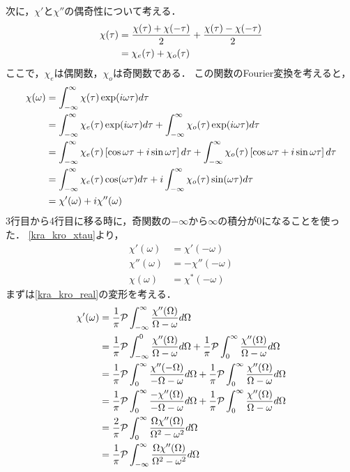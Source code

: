 次に，$\chi'$と$\chi''$の偶奇性について考える．
\begin{align}
  \chi(\tau) &= \dfrac{\chi(\tau)+\chi( - \tau)}{2} + \dfrac{\chi(\tau) - \chi( - \tau)}{2}\notag \\
  &= \chi_e(\tau)+\chi_o(\tau)
\end{align}
ここで，$\chi_e$は偶関数，$\chi_o$は奇関数である．
この関数のFourier変換を考えると，
\begin{align}
  \chi(\omega) &= \int^\infty_{ - \infty}\chi(\tau)\exp(i\omega\tau)d\tau\notag \\
  &= \int^\infty_{ - \infty}\chi_e(\tau)\exp(i\omega\tau)d\tau + \int^\infty_{ - \infty}\chi_o(\tau)\exp(i\omega\tau)d\tau\notag \\
  &= \int^\infty_{ - \infty}\chi_e(\tau)\left[\cos\omega\tau+i\sin\omega\tau\right]d\tau + \int^\infty_{ - \infty}\chi_o(\tau)\left[\cos\omega\tau+i\sin\omega\tau\right]d\tau\notag \\
  &= \int^\infty_{ - \infty}\chi_e(\tau)\cos(\omega\tau)d\tau + i\int^\infty_{ - \infty}\chi_o(\tau)\sin(\omega\tau)d\tau\notag \\
  &= \chi'(\omega)+i\chi''(\omega) \label{kra_kro_xtau}
\end{align}
3行目から4行目に移る時に，奇関数の$ - \infty$から$\infty$の積分が0になることを使った．
\eqref{kra_kro_xtau}より，
\begin{align}
  \chi'(\omega) &= \chi'( - \omega)\label{kra_kro_even} \\
  \chi''(\omega) &=  - \chi''( - \omega)\label{kra_kro_odd} \\
  \chi(\omega) &= \chi^*( - \omega)
\end{align}
まずは\eqref{kra_kro_real}の変形を考える．
\begin{align}
  \chi'(\omega) &= \dfrac{1}{\pi}\mathcal{P}\int^\infty_{ - \infty}\dfrac{\chi''(\Omega)}{\Omega - \omega}d\Omega\notag \\
  &= \dfrac{1}{\pi}\mathcal{P}\int^0_{ - \infty}\dfrac{\chi''(\Omega)}{\Omega - \omega}d\Omega + \dfrac{1}{\pi}\mathcal{P}\int^\infty_0\dfrac{\chi''(\Omega)}{\Omega - \omega}d\Omega\notag \\
  &= \dfrac{1}{\pi}\mathcal{P}\int^\infty_0\dfrac{\chi''( - \Omega)}{ - \Omega - \omega}d\Omega + \dfrac{1}{\pi}\mathcal{P}\int^\infty_0\dfrac{\chi''(\Omega)}{\Omega - \omega}d\Omega\notag \\
  &= \dfrac{1}{\pi}\mathcal{P}\int^\infty_0\dfrac{ - \chi''(\Omega)}{ - \Omega - \omega}d\Omega + \dfrac{1}{\pi}\mathcal{P}\int^\infty_0\dfrac{\chi''(\Omega)}{\Omega - \omega}d\Omega\notag \\
  &= \dfrac{2}{\pi}\mathcal{P}\int^\infty_0\dfrac{\Omega\chi''(\Omega)}{\Omega^2 - \omega^2}d\Omega\label{kra_kro_real1} \\
  &= \dfrac{1}{\pi}\mathcal{P}\int^\infty_{ - \infty}\dfrac{\Omega\chi''(\Omega)}{\Omega^2 - \omega^2}d\Omega\label{kra_kro_real2}
\end{align}
